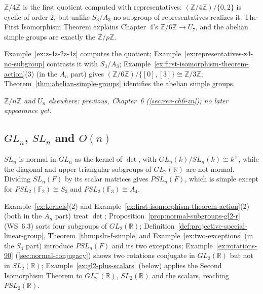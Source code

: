 \documentclass[11pt]{report}
\begin{document}
$\mathbb{Z}/4\mathbb{Z}$ is the first quotient computed with representatives: $(\mathbb{Z}/4\mathbb{Z})/\{0, 2\}$ is cyclic of order $2$, but unlike $S_3/A_3$ no subgroup of representatives realizes it. The First Isomorphism Theorem explains Chapter~4's $\mathbb{Z}/6\mathbb{Z} \to U_7$, and the abelian simple groups are exactly the $\mathbb{Z}/p\mathbb{Z}$.

Example~\ref{ex:z-4z-2z-4z} computes the quotient; Example~\ref{ex:representatives-z4-no-subgroup} contrasts it with $S_3/A_3$; Example~\ref{ex:first-isomorphism-theorem-action}(3) (in the $A_n$ part) gives $(\mathbb{Z}/6\mathbb{Z})/\{[0], [3]\} \cong \mathbb{Z}/3\mathbb{Z}$; Theorem~\ref{thm:abelian-simple-groups} identifies the abelian simple groups.

\textit{$\mathbb{Z}/n\mathbb{Z}$ and $U_n$ elsewhere: previous, Chapter~6 (\ref{sec:rev-ch6-zn}); no later appearance yet.}

\subsection{\texorpdfstring{$GL_n$, $SL_n$ and $O(n)$}{GLₙ, SLₙ and O(n)}}\label{sec:rev-ch8-gl}

$SL_n$ is normal in $GL_n$ as the kernel of $\det$, with $GL_n(k)/SL_n(k) \cong k^\times$, while the diagonal and upper triangular subgroups of $GL_2(\mathbb{R})$ are not normal. Dividing $SL_n(F)$ by its scalar matrices gives $PSL_n(F)$, which is simple except for $PSL_2(\mathbb{F}_2) \cong S_3$ and $PSL_2(\mathbb{F}_3) \cong A_4$.

Example~\ref{ex:kernels}(2) and Example~\ref{ex:first-isomorphism-theorem-action}(2) (both in the $A_n$ part) treat $\det$; Proposition~\ref{prop:normal-subgroups-gl2-r} (WS~6.3) sorts four subgroups of $GL_2(\mathbb{R})$; Definition~\ref{def:projective-special-linear-group}, Theorem~\ref{thm:psln-f-simple} and Example~\ref{ex:two-exceptions} (in the $S_4$ part) introduce $PSL_n(F)$ and its two exceptions; Example~\ref{ex:rotations-90} (\ref{sec:normal-conjugacy}) shows two rotations conjugate in $GL_2(\mathbb{R})$ but not in $SL_2(\mathbb{R})$; Example~\ref{ex:gl2-plus-scalars} (below) applies the Second Isomorphism Theorem to $GL_2^+(\mathbb{R})$, $SL_2(\mathbb{R})$ and the scalars, reaching $PSL_2(\mathbb{R})$.
\end{document}
